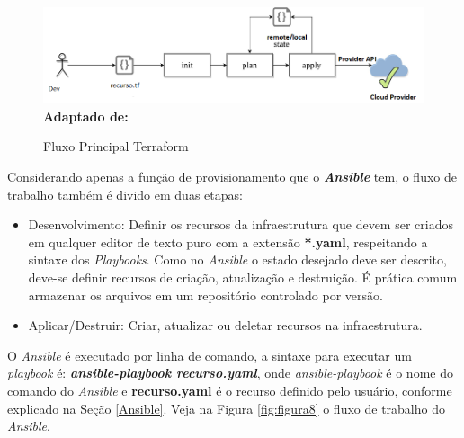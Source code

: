 \begin{figure}[H]
	\centering	
	\caption[\hspace{0.1cm}Fluxo Principal Terraform]{Fluxo Principal Terraform}
	\vspace{-0.4cm}
	\includegraphics[width=1.0\textwidth]{artigo/figuras/terraform_single_workflow.png}
	 \vspace{-0.2cm}
	\\\textbf{\footnotesize Adaptado de: \cite{Turbinskii}}
	\label{fig:figura7}
\end{figure}
\vspace{-0.5cm}

\hfill

Considerando apenas a função de provisionamento que o \textbf{\textit{Ansible}} tem, o fluxo de trabalho também é divido em duas etapas:

\begin{itemize}
  \item Desenvolvimento: Definir os recursos da infraestrutura que devem ser criados em qualquer editor de texto puro com a extensão \textbf{*.yaml}, respeitando a sintaxe dos \textit{Playbooks}. Como no \textit{Ansible} o estado desejado deve ser descrito, deve-se definir recursos de criação, atualização e destruição.  É prática comum armazenar os arquivos em um repositório controlado por versão. 
  \item Aplicar/Destruir: Criar, atualizar ou deletar recursos na infraestrutura. 
\end{itemize}

O \textit{Ansible} é executado por linha de comando, a sintaxe para executar um \textit{playbook} é: \textbf{\textit{ansible-playbook recurso.yaml}}, onde \textit{ansible-playbook} é o nome do comando do \textit{Ansible} e \textbf{recurso.yaml} é o recurso definido pelo usuário, conforme explicado na Seção \ref{Ansible}. Veja na Figura \ref{fig:figura8} o fluxo de trabalho do \textit{Ansible}.   


